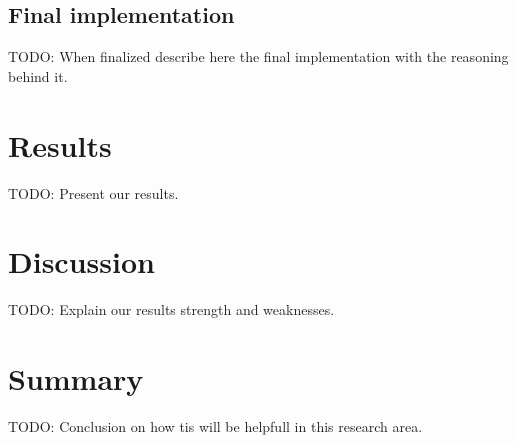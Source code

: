 \documentclass[10pt,conference,compsocconf]{IEEEtran}
\begin{document}
\subsection{Final implementation}

TODO: When finalized describe here the final implementation with the reasoning behind it.

\section{Results}
TODO: Present our results.

\section{Discussion}
TODO: Explain our results strength and weaknesses.

\section{Summary}
TODO: Conclusion on how tis will be helpfull in this research area.



\end{document}
